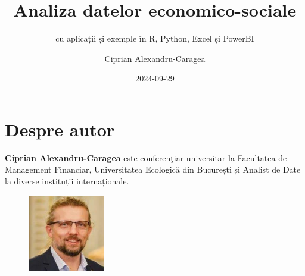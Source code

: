 \documentclass[
  11pt,
  b5paper,
  nottoc]{book}
\title{Analiza datelor economico-sociale}
\subtitle{cu aplicații și exemple în R, Python, Excel și PowerBI}
\author{Ciprian Alexandru-Caragea}
\date{2024-09-29}
\renewcommand{\contentsname}{Cuprins}
\renewcommand*\contentsname{Table of contents}
\newcommand\contentsname{Table of contents}
\begin{document}
\frontmatter
\maketitle
\ifdefined\Shaded\renewenvironment{Shaded}{\begin{tcolorbox}[breakable, sharp corners, interior hidden, borderline west={3pt}{0pt}{shadecolor}, enhanced, frame hidden, boxrule=0pt]}{\end{tcolorbox}}\fi

\renewcommand*\contentsname{Cuprins}
{
\setcounter{tocdepth}{1}
\tableofcontents
}
\listoffigures
\listoftables
\mainmatter
{}

\hypertarget{despre-autor}{%
\chapter*{Despre autor}\label{despre-autor}}


\setcounter{page}{3}

\textbf{Ciprian Alexandru-Caragea} este conferenţiar universitar la
Facultatea de Management Financiar, Universitatea Ecologică din
București și Analist de Date la diverse instituții internaționale.\\

\begin{figure}
  \begin{center}
    \includegraphics[width=0.3\textwidth]{images/Ciprian_DGINS2018.jpg}
  \end{center}
\end{figure}
\end{document}
